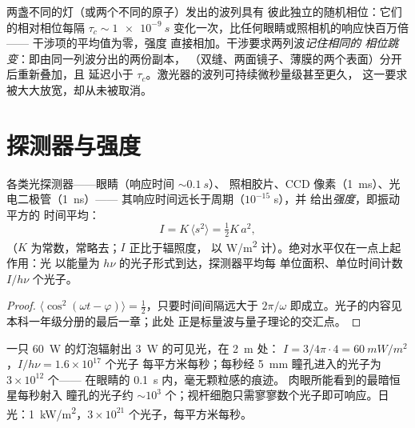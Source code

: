 \begin{remark}[两个光源与同一光源]\label{rem:b2:scalar-light-model:twosources}
两盏不同的灯（或两个不同的原子）发出的波列具有
彼此独立的随机相位：它们的相对相位每隔 $\tau_c
\sim \qty{1e-9}{s}$ 变化一次，比任何眼睛或照相机的响应快百万倍——
干涉项的平均值为零，强度
直接相加。干涉要求两列波\emph{记住相同的
相位跳变}：即由同一列波分出的两份副本，
（双缝、两面镜子、薄膜的两个表面）分开后重新叠加，且
延迟小于 $\tau_c$。激光器的波列可持续微秒量级甚至更久，
这一要求被大大放宽，却从未被取消。
\end{remark}

\section{探测器与强度}

\begin{proposition}[探测器测量什么]\label{prop:b2:scalar-light-model:intensity}
各类光探测器——眼睛（响应时间 $\sim\qty{0.1}{s}$）、
照相胶片、CCD 像素（\qty{1}{ms}）、光电二极管（\qty{1}{ns}）——
其响应时间远长于周期（$10^{-15}$ s），并
给出\emph{强度}，即振动平方的
时间平均：
\[
I = K\,\langle s^2\rangle = \tfrac12K\,a^2 ,
\]
（$K$ 为常数，常略去；$I$ 正比于辐照度，
以 \unit{W/m^2} 计）。绝对水平仅在一点上起作用：光
以能量为 $h\nu$ 的光子形式到达，探测器平均每
单位面积、单位时间计数 $I/h\nu$ 个光子。
\end{proposition}

\begin{proof}
$\langle\cos^2(\omega t - \varphi)\rangle = \tfrac12$，只要时间间隔远大于
$2\pi/\omega$ 即成立。光子的内容见本科一年级分册的最后一章；此处
正是标量波与量子理论的交汇点。
\end{proof}

\begin{example}[数量级]\label{ex:b2:scalar-light-model:orders}
一只 \qty{60}{W} 的灯泡辐射出 \qty{3}{W} 的可见光，在 \qty{2}{m} 处：
$I = 3/4\pi\cdot4 = \qty{60}{mW/m^2}$，$I/h\nu = 1.6 \times 10^{17}$ 个光子
每平方米每秒；每秒经 \qty{5}{mm} 瞳孔进入的光子为 $3 \times 10^{12}$ 个——
在眼睛的 \qty{0.1}{s} 内，毫无颗粒感的痕迹。
肉眼所能看到的最暗恒星每秒射入
瞳孔的光子约 $\sim 10^3$ 个；视杆细胞只需寥寥数个光子即可响应。日光：\qty{1}{kW/m^2}，$3 \times 10^{21}$
个光子，每平方米每秒。
\end{example}

